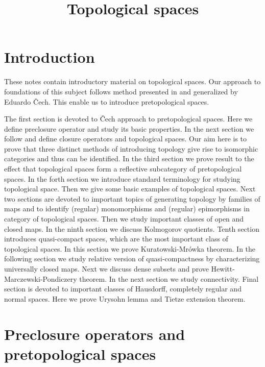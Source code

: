 



\title{Topological spaces}
\date{}
\maketitle

\section{Introduction}
\noindent
These notes contain introductory material on topological spaces. Our approach to foundations of this subject follows method presented in \cite{kuratowski1922operation} and generalized by Eduardo \v{C}ech. This enable us to introduce pretopological spaces.

The first section is devoted to \v{C}ech approach to pretopological spaces. Here we define preclosure operator and study its basic properties. In the next section we follow \cite{kuratowski1922operation} and define closure operators and topological spaces. Our aim here is to prove that three distinct methods of introducing topology give rise to isomorphic categories and thus can be identified. In the third section we prove result to the effect that topological spaces form a reflective subcategory of pretopological spaces. In the forth section we introduce standard terminology for studying topological space. Then we give some basic examples of topological spaces. Next two sections are devoted to important topics of generating topology by families of maps and to identify (regular) monomorphisms and (regular) epimorphisms in category of topological spaces. Then we study important classes of open and closed maps. In the ninth section we discuss Kolmogorov quotients. Tenth section introduces quasi-compact spaces, which are the most important class of topological spaces. In this section we prove Kuratowski-Mrówka theorem. In the following section we study relative version of quasi-compactness by characterizing universally closed maps. Next we discuss dense subsets and prove Hewitt-Marczewski-Pondiczery theorem. In the next section we study connectivity. Final section is devoted to important classes of Hausdorff, completely regular and normal spaces. Here we prove Urysohn lemma and Tietze extension theorem.

\section{Preclosure operators and pretopological spaces}

